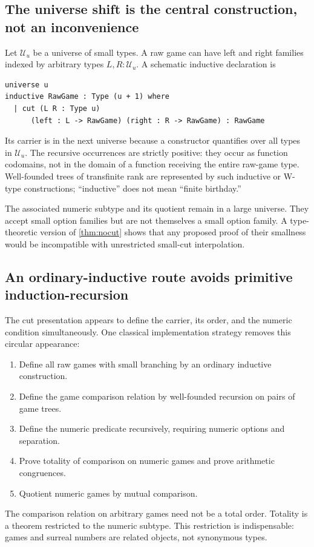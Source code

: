 \documentclass[11pt,letterpaper]{article}
\numberwithin{equation}{section}
\theoremstyle{definition}
\theoremstyle{remark}
\newcommand{\UU}{\mathcal{U}}
\begin{document}
\subsection{The universe shift is the central construction, not an inconvenience}
Let $\UU_u$ be a universe of small types. A raw game can have left and right families indexed by arbitrary types $L,R:\UU_u$. A schematic inductive declaration is
\begin{lstlisting}
universe u
inductive RawGame : Type (u + 1) where
  | cut (L R : Type u)
      (left : L -> RawGame) (right : R -> RawGame) : RawGame
\end{lstlisting}
Its carrier is in the next universe because a constructor quantifies over all types in $\UU_u$. The recursive occurrences are strictly positive: they occur as function codomains, not in the domain of a function receiving the entire raw-game type. Well-founded trees of transfinite rank are represented by such inductive or W-type constructions; ``inductive'' does not mean ``finite birthday.''

The associated numeric subtype and its quotient remain in a large universe. They accept small option families but are not themselves a small option family. A type-theoretic version of \cref{thm:nocut} shows that any proposed proof of their smallness would be incompatible with unrestricted small-cut interpolation.

\subsection{An ordinary-inductive route avoids primitive induction-recursion}
The cut presentation appears to define the carrier, its order, and the numeric condition simultaneously. One classical implementation strategy removes this circular appearance:
\begin{enumerate}
\item Define all raw games with small branching by an ordinary inductive construction.
\item Define the game comparison relation by well-founded recursion on pairs of game trees.
\item Define the numeric predicate recursively, requiring numeric options and separation.
\item Prove totality of comparison on numeric games and prove arithmetic congruences.
\item Quotient numeric games by mutual comparison.
\end{enumerate}
The comparison relation on arbitrary games need not be a total order. Totality is a theorem restricted to the numeric subtype. This restriction is indispensable: games and surreal numbers are related objects, not synonymous types.
\end{document}
